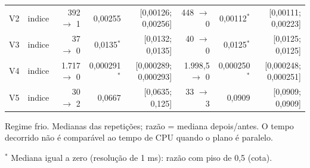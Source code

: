 {\begin{tabular}{llrrrrrr}
V2 & indice & 392 $\to$ 1 & 0,00255 & [0,00126; 0,00256] & 448 $\to$ 0 & 0,00112$^{*}$ & [0,00111; 0,00223] \\
V3 & indice & 37 $\to$ 0 & 0,0135$^{*}$ & [0,0132; 0,0135] & 40 $\to$ 0 & 0,0125$^{*}$ & [0,0125; 0,0125] \\
V4 & indice & 1.717 $\to$ 0 & 0,000291$^{*}$ & [0,000289; 0,000293] & 1.998,5 $\to$ 0 & 0,000250$^{*}$ & [0,000248; 0,000251] \\
V5 & indice & 30 $\to$ 2 & 0,0667 & [0,0635; 0,125] & 33 $\to$ 3 & 0,0909 & [0,0909; 0,0909] \\
\bottomrule
\end{tabular}\par
\vspace{3pt}
\begin{minipage}{\linewidth}\footnotesize
Regime frio. Medianas das repetições; razão = mediana depois/antes. O tempo decorrido não é comparável ao tempo de CPU quando o plano é paralelo.\par
$^{*}$ Mediana igual a zero (resolução de 1 ms): razão com piso de 0,5 (cota).
\end{minipage}
}
